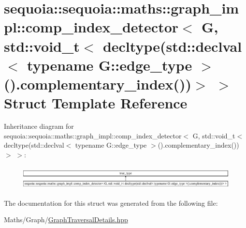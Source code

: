 \hypertarget{structsequoia_1_1sequoia_1_1maths_1_1graph__impl_1_1comp__index__detector_3_01_g_00_01std_1_1voif285704c84bad219b831bf7c50cfe852}{}\section{sequoia\+::sequoia\+::maths\+::graph\+\_\+impl\+::comp\+\_\+index\+\_\+detector$<$ G, std\+::void\+\_\+t$<$ decltype(std\+::declval$<$ typename G\+::edge\+\_\+type $>$().complementary\+\_\+index())$>$ $>$ Struct Template Reference}
\label{structsequoia_1_1sequoia_1_1maths_1_1graph__impl_1_1comp__index__detector_3_01_g_00_01std_1_1voif285704c84bad219b831bf7c50cfe852}
Inheritance diagram for sequoia\+::sequoia\+::maths\+::graph\+\_\+impl\+::comp\+\_\+index\+\_\+detector$<$ G, std\+::void\+\_\+t$<$ decltype(std\+::declval$<$ typename G\+::edge\+\_\+type $>$().complementary\+\_\+index())$>$ $>$\+:\begin{figure}[H]
\begin{center}
\leavevmode
\includegraphics[height=1.274175cm]{structsequoia_1_1sequoia_1_1maths_1_1graph__impl_1_1comp__index__detector_3_01_g_00_01std_1_1voif285704c84bad219b831bf7c50cfe852}
\end{center}
\end{figure}


The documentation for this struct was generated from the following file\+:\begin{DoxyCompactItemize}
\item 
Maths/\+Graph/\mbox{\hyperlink{_graph_traversal_details_8hpp}{Graph\+Traversal\+Details.\+hpp}}\end{DoxyCompactItemize}
